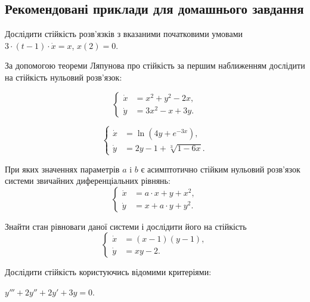 \subsection*{Рекомендовані приклади для домашнього завдання}

\begin{problem}
	Дослідити стійкість розв'язків з вказаними початковими умовами $3 \cdot (t - 1) \cdot \dot x = x$, $x(2) = 0$.
\end{problem}

За допомогою теореми Ляпунова про стійкість за першим наближенням дослідити на стійкість нульовий розв'язок:

\begin{problem}
	\[\left\{ \begin{aligned} \dot x &= x^2 + y^2 - 2 x, \\ \dot y &= 3 x^2 - x + 3 y. \end{aligned} \right.\]
\end{problem}

\begin{problem}
	\[\left\{ \begin{aligned} \dot x &= \ln (4 y + e^{- 3 x}), \\ \dot y &= 2 y - 1 + \sqrt[3]{1 - 6 x}. \end{aligned} \right.\]
\end{problem}

\begin{problem}
	При яких значеннях параметрів $a$ i $b$ є асимптотично стійким нульовий розв'язок системи звичайних диференціальних рівнянь: 
	\[\left\{ \begin{aligned} \dot x &= a \cdot x + y + x^2, \\ \dot y &= x + a \cdot y + y^2. \end{aligned} \right.\]
\end{problem}

\begin{problem}
	Знайти стан рівноваги даної системи і дослідити його на стійкість 
	\[\left\{ \begin{aligned} \dot x &= (x - 1) (y - 1), \\ \dot y &= x y - 2. \end{aligned} \right.\]
\end{problem}

Дослідити стійкість користуючись відомими критеріями:

\begin{problem}
	$y''' + 2 y'' + 2 y' + 3 y = 0$.
\end{problem}

